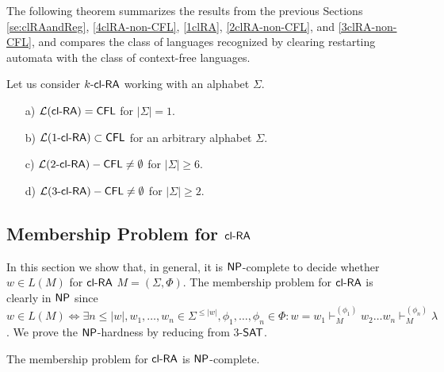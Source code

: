 The following theorem summarizes the results from the previous Sections
\ref{se:clRAandReg}, \ref{4clRA-non-CFL}, \ref{1clRA}, \ref{2clRA-non-CFL}, and \ref{3clRA-non-CFL},
and compares the class of languages recognized by clearing restarting automata
with the class of context-free languages.

\begin{theorem} Let us consider $\mbox{\sf $k$-\mbox{\sf cl-RA\/}}$ working with an alphabet $\Sigma$.
\begin{enumerate}
    \item[a)]
        $\calL{\clRA} = \CFL$ for $|\Sigma| = 1$.
    \item[b)]
        $\calL{\kclRA[1]} \subset \CFL$ for an arbitrary alphabet $\Sigma$.
    \item[c)]
        $\calL{\kclRA[2]} - \CFL \not= \emptyset$ for $|\Sigma| \ge 6$.
    \item[d)]
        $\calL{\kclRA[3]} - \CFL \not= \emptyset$ for $|\Sigma| \ge 2$.
\end{enumerate}
\end{theorem}

\subsection{Membership Problem for $\mbox{\sf cl-RA\/}$}\label{clra_membership}

In this section we show that, in general, it is $\NP$-complete to decide whether $w \in L(M)$ for $\mbox{\sf cl-RA\/}$ $M = (\Sigma, \Phi)$. The membership problem for $\mbox{\sf cl-RA\/}$ is clearly in $\NP$ since $w \in L(M) \Leftrightarrow \exists n \le |w|, w_1, \ldots, w_n \in \Sigma^{\le |w|}, \phi_1, \ldots, \phi_n \in \Phi: w = w_1 \vdash_M^{(\phi_1)} w_2 \ldots w_n \vdash_M^{(\phi_n)} \lambda$. We prove the $\NP$-hardness by reducing from $3$-$\textup{\sf SAT}$.

\begin{theorem}\label{theorem:clra_membership}
The membership problem for $\mbox{\sf cl-RA\/}$ is $\NP$-complete.
\end{theorem}


